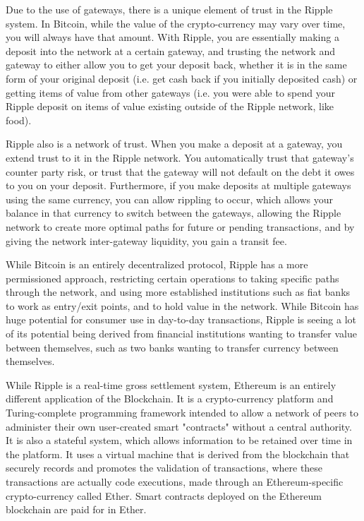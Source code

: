 \documentclass{article}
\begin{document}
	Due to the use of gateways, there is a unique element of trust in the Ripple system. In Bitcoin, while the value of the crypto-currency may vary over time, you will always have that amount. With Ripple, you are essentially making a deposit into the network at a certain gateway, and trusting the network and gateway to either allow you to get your deposit back, whether it is in the same form of your original deposit (i.e. get cash back if you initially deposited cash) or getting items of value from other gateways (i.e. you were able to spend your Ripple deposit on items of value existing outside of the Ripple network, like food).
	
	Ripple also is a network of trust. When you make a deposit at a gateway, you extend trust to it in the Ripple network. You automatically trust that gateway's counter party risk, or trust that the gateway will not default on the debt it owes to you on your deposit. Furthermore, if you make deposits at multiple gateways using the same currency, you can allow rippling to occur, which allows your balance in that currency to switch between the gateways, allowing the Ripple network to create more optimal paths for future or pending transactions, and by giving the network inter-gateway liquidity, you gain a transit fee.
	
	While Bitcoin is an entirely decentralized protocol, Ripple has a more permissioned approach, restricting certain operations to taking specific paths through the network, and using more established institutions such as fiat banks to work as entry/exit points, and to hold value in the network. While Bitcoin has huge potential for consumer use in day-to-day transactions, Ripple is seeing a lot of its potential being derived from financial institutions wanting to transfer value between themselves, such as two banks wanting to transfer currency between themselves.
	
	While Ripple is a real-time gross settlement system, Ethereum is an entirely different application of the Blockchain. It is a crypto-currency platform and Turing-complete programming framework intended to allow a network of peers to administer their own user-created smart "contracts" without a central authority. It is also a stateful system, which allows information to be retained over time in the platform. It uses a virtual machine that is derived from the blockchain that securely records and promotes the validation of transactions, where these transactions are actually code executions, made through an Ethereum-specific crypto-currency called Ether. Smart contracts deployed on the Ethereum blockchain are paid for in Ether.
	
\end{document}
